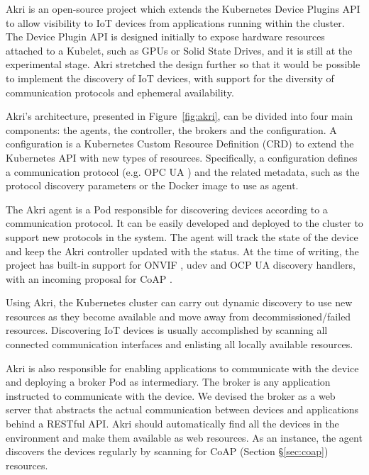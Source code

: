 Akri \cite{akri} is an open-source project which extends the Kubernetes Device Plugins API \cite{k8s-device-plugins} to allow visibility to IoT devices from applications running within the cluster. The Device Plugin API is designed initially to expose hardware resources attached to a Kubelet, such as GPUs or Solid State Drives, and it is still at the experimental stage. Akri stretched the design further so that it would be possible to implement the discovery of IoT devices, with support for the diversity of communication protocols and  ephemeral availability.

Akri's architecture, presented in Figure~\ref{fig:akri}, can be divided into four main components: the agents, the controller, the brokers and the configuration. A configuration is a Kubernetes Custom Resource Definition (CRD) to extend the Kubernetes API with new types of resources. Specifically, a configuration defines a communication protocol (e.g. OPC UA \cite{gruner2016restful}) and the related metadata, such as the protocol discovery parameters or the Docker image to use as agent.

The Akri agent is a Pod responsible for discovering devices according to a communication protocol. It can be easily developed and deployed to the cluster to support new protocols in the system. The agent will track the state of the device and keep the Akri controller updated with the status. At the time of writing, the project has built-in support for ONVIF \cite{onvif}, udev \cite{udev} and OCP UA \cite{gruner2016restful} discovery handlers, with an incoming proposal for CoAP \cite{bormann2012coap}.

Using Akri, the Kubernetes cluster can carry out dynamic discovery to use new resources as they become available and move away from decommissioned/failed resources. Discovering IoT devices is usually accomplished by scanning all connected communication interfaces and enlisting all locally available resources.

Akri is also responsible for enabling applications to communicate with the device and deploying a broker Pod as intermediary. The broker is any application instructed to communicate with the device. We devised the broker as a web server that abstracts the actual communication between devices and applications behind a RESTful API. Akri should automatically find all the devices in the environment and make them available as web resources. As an instance, the agent discovers the devices regularly by scanning for CoAP (Section §\ref{sec:coap}) resources.

